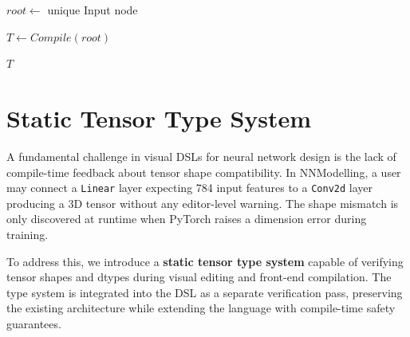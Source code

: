 \documentclass[11pt,a4paper]{article}
\begin{document}
\begin{algorithm}[H]
	\caption{Graph-to-NNTree Compilation}
	\label{alg:nntree-compilation}




	\(root \leftarrow\) unique Input node\;

	\(T \leftarrow Compile(root)\)\;

	\Return \(T\)

\end{algorithm}

\pagebreak

\section{Static Tensor Type System}

A fundamental challenge in visual DSLs for neural network design is the lack of compile-time feedback about tensor shape compatibility. In NNModelling, a user may connect a \texttt{Linear} layer expecting 784 input features to a \texttt{Conv2d} layer producing a 3D tensor without any editor-level warning. The shape mismatch is only discovered at runtime when PyTorch raises a dimension error during training.

To address this, we introduce a \textbf{static tensor type system} capable of verifying tensor shapes and dtypes during visual editing and front-end compilation. The type system is integrated into the DSL as a separate verification pass, preserving the existing architecture while extending the language with compile-time safety guarantees.
\end{document}
